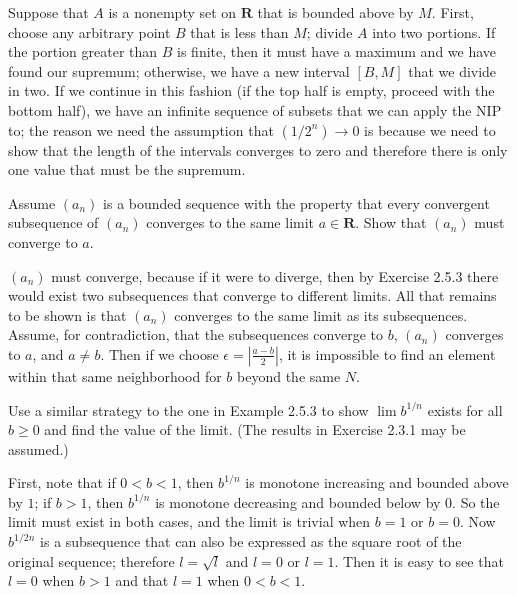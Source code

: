 \begin{solution}
  Suppose that $A$ is a nonempty set on $\mathbf{R}$ that is bounded above by $M$. First, choose any arbitrary point $B$ that is less than $M$; divide $A$ into two portions. If the portion greater than $B$ is finite, then it must have a maximum and we have found our supremum; otherwise, we have a new interval $[B,M]$ that we divide in two. If we continue in this fashion (if the top half is empty, proceed with the bottom half), we have an infinite sequence of subsets that we can apply the NIP to; the reason we need the assumption that $\left(1 / 2^n \right) \rightarrow 0$ is because we need to show that the length of the intervals converges to zero and therefore there is only one value that must be the supremum.
\end{solution}

\begin{exercise}
  Assume $\left(a_{n}\right)$ is a bounded sequence with the property that every convergent subsequence of $\left(a_{n}\right)$ converges to the same limit $a \in \mathbf{R}$. Show that $\left(a_{n}\right)$ must converge to $a$.
\end{exercise}

\begin{solution}
  $(a_n)$ must converge, because if it were to diverge, then by Exercise 2.5.3 there would exist two subsequences that converge to different limits. All that remains to be shown is that $(a_n)$ converges to the same limit as its subsequences. Assume, for contradiction, that the subsequences converge to $b$, $(a_n)$ converges to $a$, and $a\neq b$. Then if we choose $\epsilon = \left| \frac{a-b}{2} \right|$, it is impossible to find an element within that same neighborhood for $b$ beyond the same $N$.
\end{solution}

\begin{exercise}
  Use a similar strategy to the one in Example 2.5.3 to show $\lim b^{1 / n}$ exists for all $b \geq 0$ and find the value of the limit. (The results in Exercise 2.3.1 may be assumed.)
\end{exercise}

\begin{solution}
  First, note that if $0 < b < 1$, then $b^{1/n}$ is monotone increasing and bounded above by $1$; if $b > 1$, then $b^{1/n}$ is monotone decreasing and bounded below by $0$. So the limit must exist in both cases, and the limit is trivial when $b = 1$ or $b = 0$. Now $b^{1/2n}$ is a subsequence that can also be expressed as the square root of the original sequence; therefore $l = \sqrt l$ and $l = 0$ or $l = 1$. Then it is easy to see that $l = 0$ when $b > 1$ and that $l = 1$ when $0 < b < 1$. 
\end{solution}

